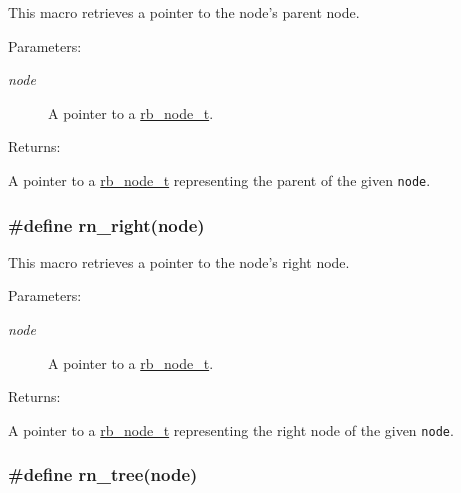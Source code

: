 This macro retrieves a pointer to the node's parent node.\begin{Desc}
\item[Parameters: ]\par
\begin{description}
\item[{\em 
node}]A pointer to a \hyperlink{group__dbprim__rbtree_a1}{rb\_\-node\_\-t}.\end{description}
\end{Desc}
\begin{Desc}
\item[Returns: ]\par
A pointer to a \hyperlink{group__dbprim__rbtree_a1}{rb\_\-node\_\-t} representing the parent of the given {\tt node}. \end{Desc}
\hypertarget{group__dbprim__rbtree_a31}{
\subsubsection[rn\_\-right]{\setlength{\rightskip}{0pt plus 5cm}\#define rn\_\-right(node)}}
\label{group__dbprim__rbtree_a31}


This macro retrieves a pointer to the node's right node.\begin{Desc}
\item[Parameters: ]\par
\begin{description}
\item[{\em 
node}]A pointer to a \hyperlink{group__dbprim__rbtree_a1}{rb\_\-node\_\-t}.\end{description}
\end{Desc}
\begin{Desc}
\item[Returns: ]\par
A pointer to a \hyperlink{group__dbprim__rbtree_a1}{rb\_\-node\_\-t} representing the right node of the given {\tt node}. \end{Desc}
\hypertarget{group__dbprim__rbtree_a28}{
\subsubsection[rn\_\-tree]{\setlength{\rightskip}{0pt plus 5cm}\#define rn\_\-tree(node)}}
\label{group__dbprim__rbtree_a28}


